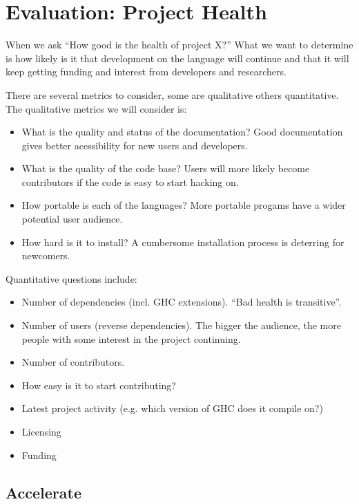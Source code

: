 \chapter{Evaluation: Project Health}

When we ask ``How good is the health of project X?'' What we want to
determine is how likely is it that development on the language will
continue and that it will keep getting funding and interest from
developers and researchers.

There are several metrics to consider, some are qualitative others
quantitative. The qualitative metrics we will consider is:

\begin{itemize}
\item What is the quality and status of the documentation? Good
  documentation gives better acessibility for new users and
  developers.
\item What is the quality of the code base? Users will more likely
  become contributors if the code is easy to start hacking on.
\item How portable is each of the languages? More portable progams
  have a wider potential user audience.
\item How hard is it to install? A cumbersome installation process is
  deterring for newcomers.
\end{itemize}

Quantitative questions include:
\begin{itemize}
\item Number of dependencies (incl. GHC extensions). ``Bad health is transitive''.
\item Number of users (reverse dependencies). The bigger the audience, the more people with some interest in the project continuing.
\item Number of contributors.
\item How easy is it to start contributing?
\item Latest project activity (e.g. which version of GHC does it compile on?)
\item Licensing
\item Funding
\end{itemize}



\section{Accelerate}
